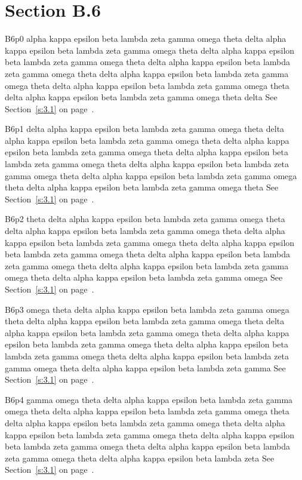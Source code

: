 \section{Section B.6}\label{s:B.6}
B6p0 alpha kappa epsilon beta lambda zeta gamma omega theta delta alpha kappa epsilon beta lambda zeta gamma omega theta delta alpha kappa epsilon beta lambda zeta gamma omega theta delta alpha kappa epsilon beta lambda zeta gamma omega theta delta alpha kappa epsilon beta lambda zeta gamma omega theta delta alpha kappa epsilon beta lambda zeta gamma omega theta delta alpha kappa epsilon beta lambda zeta gamma omega theta delta See Section~\ref{s:3.1} on page~\pageref{s:3.1}.

B6p1 delta alpha kappa epsilon beta lambda zeta gamma omega theta delta alpha kappa epsilon beta lambda zeta gamma omega theta delta alpha kappa epsilon beta lambda zeta gamma omega theta delta alpha kappa epsilon beta lambda zeta gamma omega theta delta alpha kappa epsilon beta lambda zeta gamma omega theta delta alpha kappa epsilon beta lambda zeta gamma omega theta delta alpha kappa epsilon beta lambda zeta gamma omega theta See Section~\ref{s:3.1} on page~\pageref{s:3.1}.

B6p2 theta delta alpha kappa epsilon beta lambda zeta gamma omega theta delta alpha kappa epsilon beta lambda zeta gamma omega theta delta alpha kappa epsilon beta lambda zeta gamma omega theta delta alpha kappa epsilon beta lambda zeta gamma omega theta delta alpha kappa epsilon beta lambda zeta gamma omega theta delta alpha kappa epsilon beta lambda zeta gamma omega theta delta alpha kappa epsilon beta lambda zeta gamma omega See Section~\ref{s:3.1} on page~\pageref{s:3.1}.

B6p3 omega theta delta alpha kappa epsilon beta lambda zeta gamma omega theta delta alpha kappa epsilon beta lambda zeta gamma omega theta delta alpha kappa epsilon beta lambda zeta gamma omega theta delta alpha kappa epsilon beta lambda zeta gamma omega theta delta alpha kappa epsilon beta lambda zeta gamma omega theta delta alpha kappa epsilon beta lambda zeta gamma omega theta delta alpha kappa epsilon beta lambda zeta gamma See Section~\ref{s:3.1} on page~\pageref{s:3.1}.

B6p4 gamma omega theta delta alpha kappa epsilon beta lambda zeta gamma omega theta delta alpha kappa epsilon beta lambda zeta gamma omega theta delta alpha kappa epsilon beta lambda zeta gamma omega theta delta alpha kappa epsilon beta lambda zeta gamma omega theta delta alpha kappa epsilon beta lambda zeta gamma omega theta delta alpha kappa epsilon beta lambda zeta gamma omega theta delta alpha kappa epsilon beta lambda zeta See Section~\ref{s:3.1} on page~\pageref{s:3.1}.

